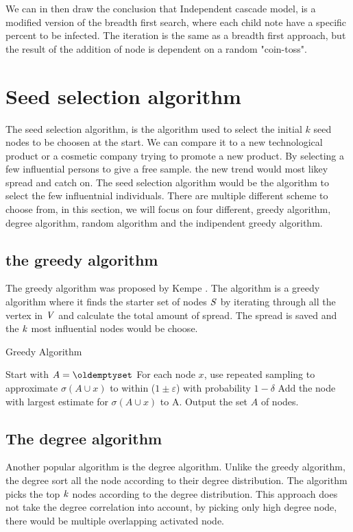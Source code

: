 {We can in then draw the conclusion that Independent cascade model, is a modified version of the breadth first search, where each child note have a specific percent to be infected. The iteration is the same as a breadth first approach, but the result of the addition of node is dependent on a random "coin-toss".


\section{Seed selection algorithm}
The seed selection algorithm, is the algorithm used to select the initial $k$ seed nodes to be choosen at the start. We can compare it to a new technological product or a cosmetic company trying to promote a new product. By selecting a few influential persons to give a free sample. the new trend would most likey spread and catch on. The seed selection algorithm would be the algorithm to select the few influentnial individuals. There are multiple different scheme to choose from, in this section, we will focus on four different, greedy algorithm, degree algorithm, random algorithm and the indipendent greedy algorithm.

\subsection{the greedy algorithm}
The  greedy algorithm was proposed by Kempe \cite{MaximizeSpread2015}. The algorithm is a greedy algorithm where it finds the starter set of nodes $\it{S}$ by iterating through all the vertex in $\it{V}$ and calculate the total amount of spread. The spread is saved and the $\it{k}$ most influential nodes would be choose.

 \begin{algorithm}
\caption{Greedy Algorithm}
\begin{algorithmic}[1]
\State Start with $A = \oldemptyset$
\State For each node $x$, use repeated sampling to approximate $\sigma(A \cup {x}) $ to within ($1 \pm \varepsilon$) with probability
$1 − \delta$
\State Add the node with largest estimate for $\sigma(A \cup {x})$ to A.
\EndWhile
\State Output the set $A$ of nodes.
\end{algorithmic}
\end{algorithm}

\subsection{The degree algorithm}
Another popular algorithm is the degree algorithm\cite{MaximizeSpread2015}. Unlike the greedy algorithm, the degree sort all the node according to their degree distribution. The algorithm picks the top $\it{k}$ nodes according to the degree distribution. This approach does not take the degree correlation into account, by picking only high degree node, there would be multiple overlapping activated node.

}
